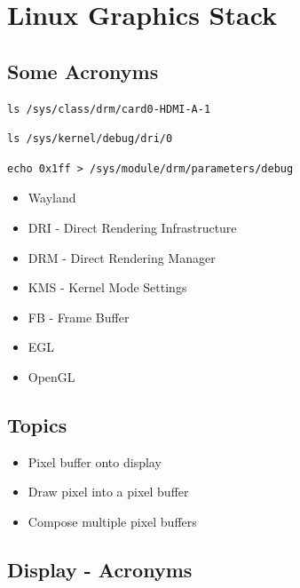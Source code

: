 \documentclass[11pt]{article}
\begin{document}
\section{Linux Graphics Stack}

\cite{navlgs}

\subsection{Some Acronyms}
\begin{verbatim}
ls /sys/class/drm/card0-HDMI-A-1
\end{verbatim}

\begin{verbatim}
ls /sys/kernel/debug/dri/0
\end{verbatim}

\begin{verbatim}
echo 0x1ff > /sys/module/drm/parameters/debug
\end{verbatim}
\begin{itemize}
    \item Wayland
    \item DRI - Direct Rendering Infrastructure
    \item DRM - Direct Rendering Manager
    \item KMS - Kernel Mode Settings
    \item FB - Frame Buffer
    \item EGL
    \item OpenGL
\end{itemize}

\subsection{Topics}

\begin{itemize}
    \item Pixel buffer onto display
    \item Draw pixel into a pixel buffer
    \item Compose multiple pixel buffers
\end{itemize}

\subsection{Display - Acronyms}
\end{document}
